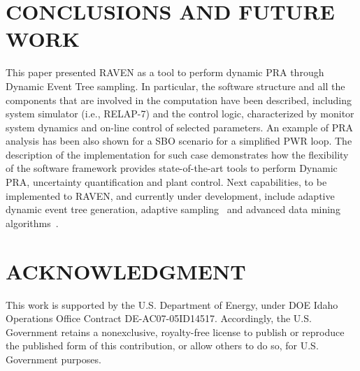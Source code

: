 \documentclass{mc2013}
\begin{document}
\section{CONCLUSIONS AND FUTURE WORK}
This paper presented RAVEN as a tool to perform dynamic PRA through Dynamic Event Tree sampling. In particular, the software structure and all the components that are involved in the computation have been described, including system simulator (i.e., RELAP-7) and the control logic, characterized by monitor system dynamics and on-line control of selected parameters.
An example of PRA analysis has been also shown for a SBO scenario for a simplified PWR loop. 
The description of the implementation for such case demonstrates how the flexibility of the software framework provides state-of-the-art tools to perform Dynamic PRA, uncertainty quantification and plant control. 
Next capabilities, to be implemented to RAVEN, and currently under development, include adaptive dynamic event tree generation, adaptive sampling~\cite{mandelliSVMANS} and advanced data mining algorithms~\cite{mandelliEsrel2011,MandelliClusteringRESS}. 
\section*{ACKNOWLEDGMENT}
This work is supported by the U.S. Department of Energy, under DOE Idaho Operations Office Contract DE-AC07-05ID14517. Accordingly, the U.S. Government retains a nonexclusive, royalty-free license to publish or reproduce the published form of this contribution, or allow others to do so, for U.S. Government purposes.



\end{document}
